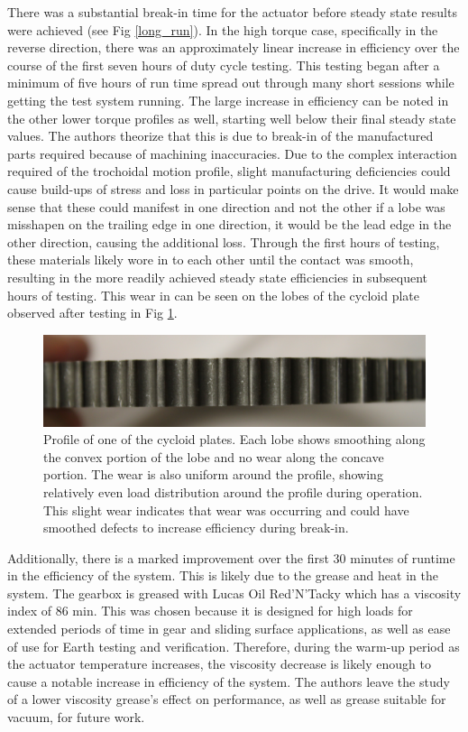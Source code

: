 There was a substantial break-in time for the actuator before steady state results were achieved (see Fig \ref{long_run}).
In the high torque case, specifically in the reverse direction, there was an approximately linear increase in efficiency over the course of the first seven hours of duty cycle testing.
This testing began after a minimum of five hours of run time spread out through many short sessions while getting the test system running.
The large increase in efficiency can be noted in the other lower torque profiles as well, starting well below their final steady state values.
The authors theorize that this is due to break-in of the manufactured parts required because of machining inaccuracies.
Due to the complex interaction required of the trochoidal motion profile, slight manufacturing deficiencies could cause build-ups of stress and loss in particular points on the drive.
It would make sense that these could manifest in one direction and not the other if a lobe was misshapen on the trailing edge in one direction, it would be the lead edge in the other direction, causing the additional loss.
Through the first hours of testing, these materials likely wore in to each other until the contact was smooth, resulting in the more readily achieved steady state efficiencies in subsequent hours of testing.
This wear in can be seen on the lobes of the cycloid plate observed after testing in Fig \ref{cycloid_plate}.

\begin{figure}[t]
	\centering
	\includegraphics[width=\linewidth]{images/cycloid_plate}
	\caption{Profile of one of the cycloid plates. Each lobe shows smoothing along the convex portion of the lobe and no wear along the concave portion. The wear is also uniform around the profile, showing relatively even load distribution around the profile during operation. This slight wear indicates that wear was occurring and could have smoothed defects to increase efficiency during break-in.}
	\label{cycloid_plate}
\end{figure}

Additionally, there is a marked improvement over the first 30 minutes of runtime in the efficiency of the system.
This is likely due to the grease and heat in the system.
The gearbox is greased with Lucas Oil Red'N'Tacky which has a viscosity index of 86 min.
This was chosen because it is designed for high loads for extended periods of time in gear and sliding surface applications, as well as ease of use for Earth testing and verification.
Therefore, during the warm-up period as the actuator temperature increases, the viscosity decrease is likely enough to cause a notable increase in efficiency of the system.
The authors leave the study of a lower viscosity grease's effect on performance, as well as grease suitable for vacuum, for future work.

